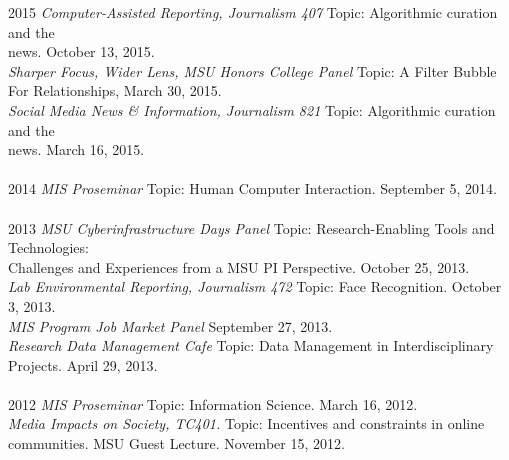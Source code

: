 \documentclass[9pt]{extarticle}
\begin{document}
\begin{tabbing}
2015 \hspace{0.3in}\=  \emph{Computer-Assisted Reporting, Journalism 407} Topic: Algorithmic curation and the \\
\> \hspace{0.5cm} news. October 13, 2015. \\
\> \emph{Sharper Focus, Wider Lens, MSU Honors College Panel} Topic: A Filter Bubble \\
\> \hspace{0.5cm} For Relationships, March 30, 2015.\\
\> \emph{Social Media News \& Information, Journalism 821} Topic: Algorithmic curation and the \\
\> \hspace{0.5cm} news. March 16, 2015. \\\\

2014 \hspace{0.3in}\=  \emph{MIS Proseminar} Topic: Human Computer Interaction. September 5, 2014.\\\\

2013 \hspace{0.3in}\=  \emph{MSU Cyberinfrastructure Days Panel} Topic: Research-Enabling Tools and Technologies:\\
\> \hspace{0.5cm} Challenges and Experiences from a MSU PI Perspective. October 25, 2013.\\ 
\> \emph{Lab Environmental Reporting, Journalism 472} Topic: Face Recognition. October 3, 2013. \\
\> \emph{MIS Program Job Market Panel} September 27, 2013. \\
\> \emph{Research Data Management Cafe} Topic: Data Management in Interdisciplinary \\
\> \hspace{0.5cm} Projects. April 29, 2013. \\\\ %

2012 \hspace{0.3in}\=  \emph{MIS Proseminar} Topic: Information Science. March 16, 2012.\\
\> \emph{Media Impacts on Society, TC401.} Topic: Incentives and constraints in online \\
\> \hspace{0.5cm} communities. MSU Guest Lecture. November 15, 2012. \\\\


\end{tabbing}
\end{document}

